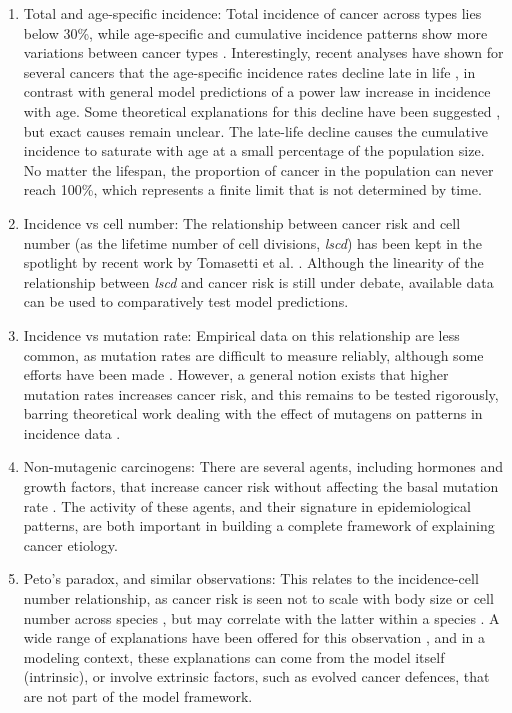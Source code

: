 \documentclass[12pt,onecolumn,twoside]{article}
\begin{document}
\begin{enumerate}
	\item Total and age-specific incidence: Total incidence of cancer across types lies below 30\%, while age-specific and cumulative incidence patterns show more variations between cancer types \autocite{AmericanCancerSociety2016}. Interestingly, recent analyses have shown for several cancers that the age-specific incidence rates decline late in life \autocite{Harding2012}, in contrast with general model predictions of a power law increase in incidence with age. Some theoretical explanations for this decline have been suggested \autocite{Frank2007}, but exact causes remain unclear. The late-life decline causes the cumulative incidence to saturate with age at a small percentage of the population size. No matter the lifespan, the proportion of cancer in the population can never reach 100\%, which represents a finite limit that is not determined by time.
	\item Incidence vs cell number: The relationship between cancer risk and cell number (as the lifetime number of cell divisions, \textit{lscd}) has been kept in the spotlight by recent work by Tomasetti et al. \autocite{Tomasetti78, Tomasetti2017}. Although the linearity of the relationship between \textit{lscd} and cancer risk is still under debate, available data can be used to comparatively test model predictions.
	\item Incidence vs mutation rate: Empirical data on this relationship are less common, as mutation rates are difficult to measure reliably, although some efforts have been made \autocite{Hao2016}. However, a general notion exists that higher mutation rates increases cancer risk, and this remains to be tested rigorously, barring theoretical work dealing with the effect of mutagens on patterns in incidence data \autocite{Frank2007}.
	\item Non-mutagenic carcinogens: There are several agents, including hormones and growth factors, that increase cancer risk without affecting the basal mutation rate \autocite{Tennant1993}. The activity of these agents, and their signature in epidemiological patterns, are both important in building a complete framework of explaining cancer etiology.
	\item Peto's paradox, and similar observations: This relates to the incidence-cell number relationship, as cancer risk is seen not to scale with body size or cell number across species \autocite{Nagy2007}, but may correlate with the latter within a species \autocite{Noble2015}. A wide range of explanations have been offered for this observation \autocite{Tollis2017b}, and in a modeling context, these explanations can come from the model itself (intrinsic), or involve extrinsic factors, such as evolved cancer defences, that are not part of the model framework.
\end{enumerate}
\end{document}
